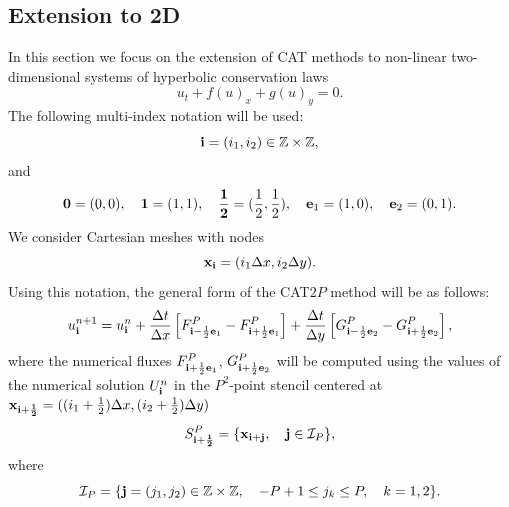 \subsection{Extension to 2D} \label{ssec:CAT_2D}
In this section we focus on the extension of CAT methods to non-linear two-dimensional systems of hyperbolic conservation laws
\begin{equation}
\label{2Dequ}
{u}_t + {f}({u})_x + {g}({u})_y=0.
\end{equation}
The following multi-index notation will be used:
$$
\mathbf{i} = (i_1, i_2) \in \mathbb{Z} \times \mathbb{Z},
$$
and
$$
\mathbf{0} = (0,0),\quad \mathbf{1} = (1,1), \quad \mathbf{\frac{1}{2}}= (\frac{1}{2}, \frac{1}{2}), \quad \mathbf{e}_1 = (1,0), \quad \mathbf{e}_2 = (0,1).
$$
We consider Cartesian meshes with nodes
$$\mathbf{x}_{\mathbf{i}} = (i_1 \Delta x, i_2 \Delta y).$$
Using this notation, the general form of the CAT$2P$ method will be as follows:
\begin{equation}
\label{2Dscheme}
u_{\mathbf{i}}^{n+1}=u_{\mathbf{i}}^n + \frac{\Delta t}{\Delta x}\left[ {F}_{\mathbf{i} -  \frac{1}{2}\mathbf{e}_1}^P-{F}_{\mathbf{i} +  \frac{1}{2}\mathbf{e}_1}^P\right] +
\frac{\Delta t}{\Delta y}\left[ {G}_{\mathbf{i} -  \frac{1}{2}\mathbf{e}_2}^P-{G}_{\mathbf{i} +  \frac{1}{2}\mathbf{e}_2}^P\right],  
\end{equation}
where the numerical fluxes ${F}_{\mathbf{i} +  \frac{1}{2}\mathbf{e}_1}^P$,  ${G}_{\mathbf{i} +  \frac{1}{2}\mathbf{e}_2}^P$ will be computed using the values of the numerical solution $U_{\mathbf{i}}^n$ in the $P^2$-point stencil centered at $\mathbf{x}_{\mathbf{i} + \mathbf{\frac{1}{2}}} = 
((i_1 + \frac{1}{2})\Delta x, (i_2 + \frac{1}{2})\Delta y)$ 
$$
S_{\mathbf{i}+\mathbf{\frac{1}{2}}}^P = \{ \mathbf{x}_{\mathbf{i} + \mathbf{j}}, \quad \mathbf{j} \in \mathcal{I}_P  \},
$$
where 
$$
\mathcal{I}_P =\{ \mathbf{j} = (j_1, j_2) \in \mathbb{Z} \times \mathbb{Z}, \quad -P +1 \leq j_k \leq P, \quad k = 1,2 \}.
$$




